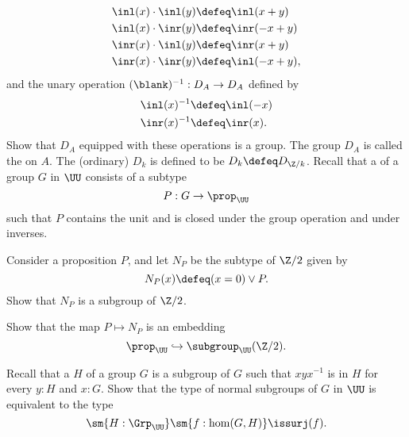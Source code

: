 \begin{exercises}
    \begin{align*}
    \inl(x)\cdot\inl(y) & \defeq \inl(x+y) \\
    \inl(x)\cdot\inr(y) & \defeq \inr(-x+y) \\
    \inr(x)\cdot\inl(y) & \defeq \inr(x+y) \\
    \inr(x)\cdot\inr(y) & \defeq \inl(-x+y),
  \end{align*}
  and the unary operation $(\blank)^{-1}:D_A\to D_A$ defined by
  \begin{align*}
    \inl(x)^{-1} & \defeq \inl(-x) \\
    \inr(x)^{-1} & \defeq \inr(x).
  \end{align*}
  Show that $D_A$ equipped with these operations is a group. The group $D_A$ is called the  on $A$. The (ordinary)  $D_k$ is defined to be $D_k\defeq D_{\Z/k}$.
  \exitem Recall that a  of a group $G$ in $\UU$ consists of a subtype
  \begin{equation*}
    P:G\to\prop_\UU
  \end{equation*}
  such that $P$ contains the unit and is closed under the group operation and under inverses.
  \begin{subexenum}
  \item Consider a proposition $P$, and let $N_P$ be the subtype of $\Z/2$ given by
    \begin{equation*}
      N_P(x)\defeq (x=0)\vee P.
    \end{equation*}
    Show that $N_P$ is a subgroup of $\Z/2$.
  \item Show that the map $P\mapsto N_P$ is an embedding
    \begin{equation*}
      \prop_\UU\hookrightarrow\subgroup_\UU(\Z/2).
    \end{equation*}
  \end{subexenum}
  \exitem Recall that a  $H$ of a group $G$ is a subgroup of $G$ such that $xyx^{-1}$ is in $H$ for every $y:H$ and $x:G$. Show that the type of normal subgroups of $G$ in $\UU$ is equivalent to the type
  \begin{equation*}
    \sm{H:\Grp_\UU}\sm{f:\hom(G,H)}\issurj(f).

\end{equation*}
\end{exercises}
